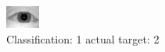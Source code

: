 \begin{figure}[h!]
\begin{center}
\includegraphics[width=0.60\columnwidth]{figures/ID915_class_1_target_2.png}
\end{center}
\caption{ Classification: 1 actual target: 2}
\label{fig:ID915_class_1_target_2}
\end{figure}
